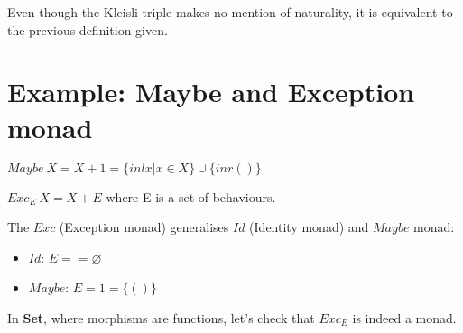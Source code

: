 \documentclass[../main.tex]{subfiles}
\begin{document}
Even though the Kleisli triple makes no mention of naturality, it is equivalent to the previous definition given.

\section{Example: Maybe and Exception monad}

$Maybe~X = X + 1 = \{inl x | x \in X\} \cup \{inr ()\}$

$Exc_E~X = X + E$ where E is a set of behaviours.

The $Exc$ (Exception monad) generalises $Id$ (Identity monad) and $Maybe$ monad:
\begin{itemize}
\item $Id$: $E = {} = \varnothing$
\item $Maybe$: $E = 1 = \{()\}$
\end{itemize}

In \textbf{Set}, where morphisms are functions, let's check that $Exc_E$ is indeed a monad.
\end{document}

